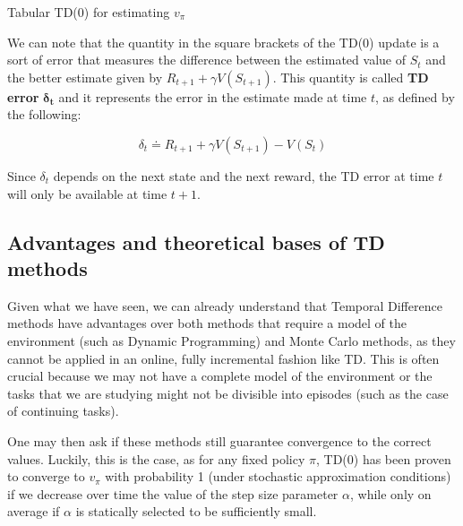 \begin{algorithm}[H]
\SetAlgoLined
{}
\Parameters{step size $\alpha \in \left] 0,1 \right]$}

\caption{Tabular TD(0) for estimating $v_\pi$}
\end{algorithm}

We can note that the quantity in the square brackets of the TD(0) update is a sort of error that measures the difference between the estimated value of $S_t$ and the better estimate given by $R_{t+1} + \gamma V(S_{t+1})$. This quantity is called \textbf{TD error} $\boldsymbol{\delta_t}$ and it represents the error in the estimate made at time $t$, as defined by the following:

\begin{equation}
    \delta_t \doteq R_{t+1} + \gamma V(S_{t+1}) - V(S_t)
    \label{eq:ch5-tderrordeltat}
\end{equation}

Since $\delta_t$ depends on the next state and the next reward, the TD error at time $t$ will only be available at time $t+1$.

\subsection{Advantages and theoretical bases of TD methods}
Given what we have seen, we can already understand that Temporal Difference methods have advantages over both methods that require a model of the environment (such as Dynamic Programming) and Monte Carlo methods, as they cannot be applied in an online, fully incremental fashion like TD. This is often crucial because we may not have a complete model of the environment or the tasks that we are studying might not be divisible into episodes (such as the case of continuing tasks).

One may then ask if these methods still guarantee convergence to the correct values. Luckily, this is the case, as for any fixed policy $\pi$, TD(0) has been proven to converge to $v_\pi$ with probability 1 (under stochastic approximation conditions) if we decrease over time the value of the step size parameter $\alpha$, while only on average if $\alpha$ is statically selected to be sufficiently small.

